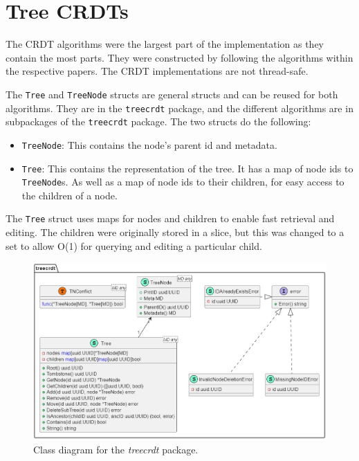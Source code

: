 \documentclass[12pt]{report}
\begin{document}
\section{Tree CRDTs}
The CRDT algorithms were the largest part of the implementation as they contain the most parts. They were constructed by following the algorithms within the respective papers. The CRDT implementations are not thread-safe.

The \texttt{Tree} and \texttt{TreeNode} structs are general structs and can be reused for both algorithms. They are in the \texttt{treecrdt} package, and the different algorithms are in subpackages of the \texttt{treecrdt} package. The two structs do the following: 

\begin{itemize}
    \item \texttt{TreeNode}: This contains the node's parent id and metadata.
    \item \texttt{Tree}: This contains the representation of the tree. It has a map of node ids to \texttt{TreeNode}s. As well as a map of node ids to their children, for easy access to the children of a node.
\end{itemize}

The \texttt{Tree} struct uses maps for nodes and children to enable fast retrieval and editing. The children were originally stored in a slice, but this was changed to a set to allow O(1) for querying and editing a particular child. 

\begin{figure}[H]
    \centering
    \includegraphics[width=1\textwidth{}]{images/treecrdt_impl.jpg} 
    \caption{Class diagram for the \textit{treecrdt} package.}
    \label{fig:treecrdt_impl} 
\end{figure} 
\end{document}
